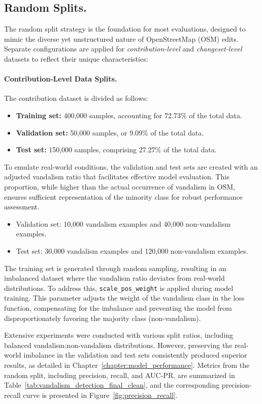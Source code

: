 \documentclass[
    13pt, %
    a4paper, %
    DIV14, %
    listof=totoc, %
    bibliography=totoc, %
    index=totoc, %
    headsepline
]{scrreprt}
\begin{document}
\subsection{Random Splits.}
The random split strategy is the foundation for most evaluations, designed to mimic the diverse yet unstructured nature of OpenStreetMap (OSM) edits. Separate configurations are applied for \textit{contribution-level} and \textit{changeset-level} datasets to reflect their unique characteristics:

\paragraph{Contribution-Level Data Splits.}
The contribution dataset is divided as follows:
\begin{itemize}
    \item \textbf{Training set:} 400,000 samples, accounting for 72.73\% of the total data.
    \item \textbf{Validation set:} 50,000 samples, or 9.09\% of the total data.
    \item \textbf{Test set:} 150,000 samples, comprising 27.27\% of the total data.
\end{itemize}

\noindent To emulate real-world conditions, the validation and test sets are created with an adjusted vandalism ratio that facilitates effective model evaluation. This proportion, while higher than the actual occurrence of vandalism in OSM, ensures sufficient representation of the minority class for robust performance assessment.
\begin{itemize}
    \item Validation set: 10,000 vandalism examples and 40,000 non-vandalism examples.
    \item Test set: 30,000 vandalism examples and 120,000 non-vandalism examples.
\end{itemize}

The training set is generated through random sampling, resulting in an imbalanced dataset where the vandalism ratio deviates from real-world distributions. To address this, \texttt{scale\_pos\_weight} is applied during model training. This parameter adjusts the weight of the vandalism class in the loss function, compensating for the imbalance and preventing the model from disproportionately favoring the majority class (non-vandalism).

Extensive experiments were conducted with various split ratios, including balanced vandalism:non-vandalism distributions. However, preserving the real-world imbalance in the validation and test sets consistently produced superior results, as detailed in Chapter~\ref{chapter:model_performance}. Metrics from the random split, including precision, recall, and AUC-PR, are summarized in Table~\ref{tab:vandalism_detection_final_clean}, and the corresponding precision-recall curve is presented in Figure~\ref{fig:precision_recall}.
\end{document}

